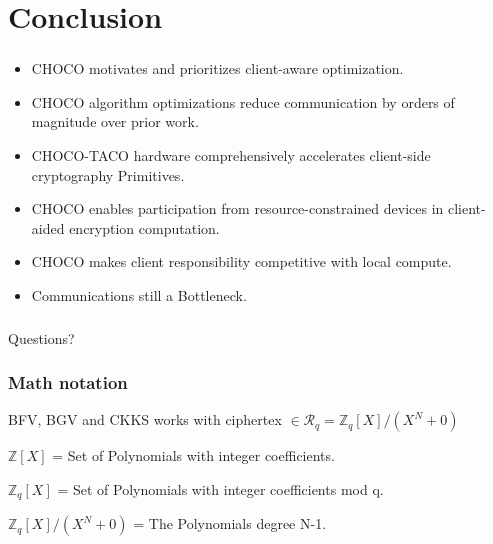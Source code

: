 \documentclass[10pt,handout]{beamer}
\begin{document}
\section{Conclusion}
\begin{frame}
\frametitle{}
\begin{itemize}
    \item CHOCO motivates and prioritizes client-aware optimization.
    \item CHOCO algorithm optimizations reduce communication by orders of magnitude over prior work.
\pause
    \item CHOCO-TACO hardware comprehensively accelerates client-side cryptography Primitives.
    \item CHOCO enables participation from resource-constrained devices in client-aided encryption computation.
\pause
    \item CHOCO makes client responsibility competitive with local compute.
    \item Communications still a Bottleneck.
\end{itemize}

\end{frame}


\begin{frame}
\frametitle{}
\Huge

\begin{center}
   Questions?
\end{center}
\end{frame}




\begin{frame}[noframenumbering]
\frametitle{Math notation}
BFV, BGV and CKKS works with ciphertex  $\in \mathcal{R}_q =\mathbb{Z}_q[X]/(X^N+0)$

$\mathbb{Z}[X]$ = Set of Polynomials with integer coefficients.

$\mathbb{Z}_q[X]$ = Set of Polynomials with integer coefficients mod q.

$\mathbb{Z}_q[X]/(X^N+0)$ = The Polynomials degree N-1.


\end{frame}
\end{document}
